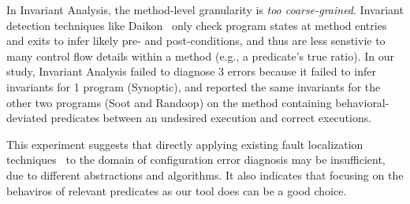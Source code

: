 In Invariant Analysis, the method-level granularity is \textit{too coarse-grained}.
Invariant detection techniques like Daikon~\cite{Ernst:1999}
only check program states at method entries and exits to infer
likely pre- and post-conditions, and thus are less
senstivie to many control flow details within a method (e.g., a predicate's
true ratio). In our study, Invariant Analysis failed to diagnose 3
errors because it failed to infer invariants for 1 program (Synoptic),
and reported the same invariants for the other two programs (Soot and Randoop)
on the method containing behavioral-deviated predicates between an undesired execution and correct executions.





This experiment suggests that directly applying existing fault localization
techniques~\cite{Jones:2002, McCamant:2003} to the domain of
configuration error diagnosis may be insufficient, due
to different abstractions and algorithms. It also indicates that
focusing on the behaviros of relevant predicates as our tool does
 can be a good choice.
